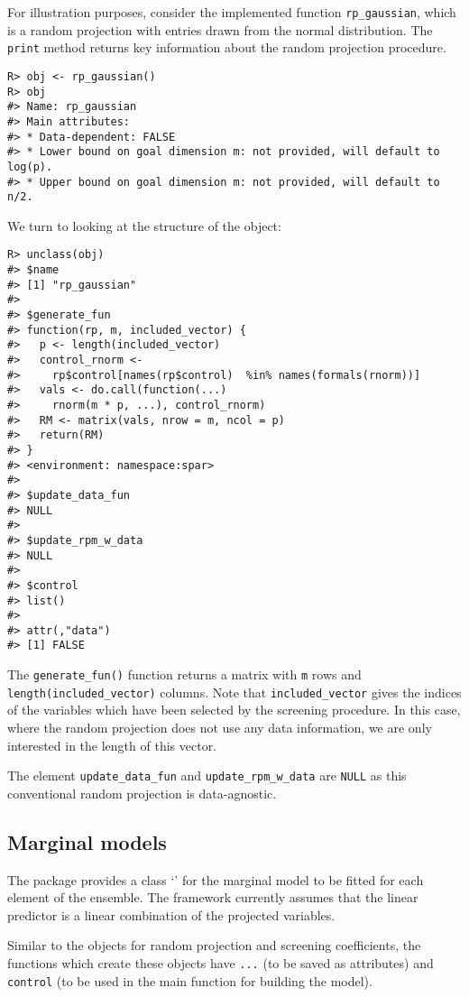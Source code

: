 \documentclass[
  article]{jss}
\newcommand{\class}[1]{`\code{#1}'}
\begin{document}
For illustration purposes, consider the implemented function
\texttt{rp\_gaussian}, which is a random projection with entries drawn
from the normal distribution. The \texttt{print} method returns key
information about the random projection procedure.

\begin{verbatim}
R> obj <- rp_gaussian()
R> obj
#> Name: rp_gaussian 
#> Main attributes: 
#> * Data-dependent: FALSE 
#> * Lower bound on goal dimension m: not provided, will default to log(p). 
#> * Upper bound on goal dimension m: not provided, will default to n/2.
\end{verbatim}

We turn to looking at the structure of the object:

\begin{verbatim}
R> unclass(obj)
#> $name
#> [1] "rp_gaussian"
#> 
#> $generate_fun
#> function(rp, m, included_vector) {
#>   p <- length(included_vector)
#>   control_rnorm <-
#>     rp$control[names(rp$control)  %in% names(formals(rnorm))]
#>   vals <- do.call(function(...)
#>     rnorm(m * p, ...), control_rnorm)
#>   RM <- matrix(vals, nrow = m, ncol = p)
#>   return(RM)
#> }
#> <environment: namespace:spar>
#> 
#> $update_data_fun
#> NULL
#> 
#> $update_rpm_w_data
#> NULL
#> 
#> $control
#> list()
#> 
#> attr(,"data")
#> [1] FALSE
\end{verbatim}

The \texttt{generate\_fun()} function returns a matrix with \texttt{m}
rows and \texttt{length(included\_vector)} columns. Note that
\texttt{included\_vector} gives the indices of the variables which have
been selected by the screening procedure. In this case, where the random
projection does not use any data information, we are only interested in
the length of this vector.

The element \texttt{update\_data\_fun} and \texttt{update\_rpm\_w\_data}
are \texttt{NULL} as this conventional random projection is
data-agnostic.

\subsection{Marginal models}\label{marginal-models}

The package provides a class \class{sparmodel} for the marginal model to
be fitted for each element of the ensemble. The framework currently
assumes that the linear predictor is a linear combination of the
projected variables.

Similar to the objects for random projection and screening coefficients,
the functions which create these objects have \texttt{...} (to be saved
as attributes) and \texttt{control} (to be used in the main function for
building the model).
\end{document}

